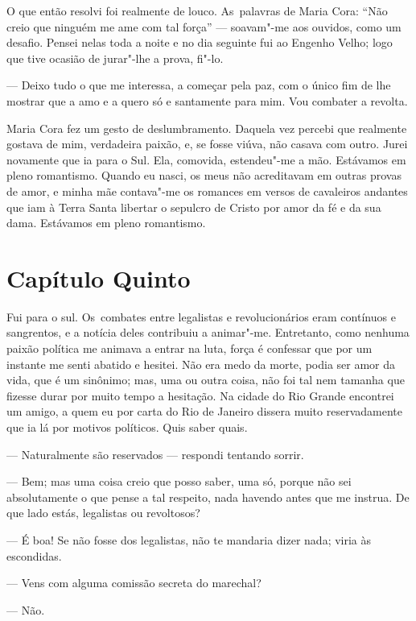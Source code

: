 \begin{linenumbers}
O que então resolvi foi realmente de louco. As~palavras de Maria Cora:
``Não creio que ninguém me ame com tal força'' --- soavam"-me aos ouvidos,
como um desafio. Pensei nelas toda a noite e no dia seguinte fui ao
Engenho Velho; logo que tive ocasião de jurar"-lhe a prova, fi"-lo.

--- Deixo tudo o que me interessa, a começar pela paz, com o único fim de
lhe mostrar que a amo e a quero só e santamente para mim. Vou combater a
revolta.

Maria Cora fez um gesto de deslumbramento. Daquela vez percebi que
realmente gostava de mim, verdadeira paixão, e, se fosse viúva, não
casava com outro. Jurei novamente que ia para o Sul. Ela, comovida,
estendeu"-me a mão. Estávamos em pleno romantismo. Quando eu nasci, os
meus não acreditavam em outras provas de amor, e minha mãe contava"-me os
romances em versos de cavaleiros andantes que iam à Terra Santa libertar
o sepulcro de Cristo por amor da fé e da sua dama. Estávamos em pleno
romantismo.

\section{Capítulo Quinto}

Fui para o sul. Os~combates entre legalistas e revolucionários eram
contínuos e sangrentos, e a notícia deles contribuiu a animar"-me.
Entretanto, como nenhuma paixão política me animava a entrar na luta,
força é confessar que por um instante me senti abatido e hesitei. Não
era medo da morte, podia ser amor da vida, que é um sinônimo; mas, uma
ou outra coisa, não foi tal nem tamanha que fizesse durar por muito
tempo a hesitação. Na cidade do Rio Grande encontrei um amigo, a quem eu
por carta do Rio de Janeiro dissera muito reservadamente que ia lá por
motivos políticos. Quis saber quais.

--- Naturalmente são reservados --- respondi tentando sorrir.

--- Bem; mas uma coisa creio que posso saber, uma só, porque não sei
absolutamente o que pense a tal respeito, nada havendo antes que me
instrua. De que lado estás, legalistas ou revoltosos?

--- É boa! Se não fosse dos legalistas, não te mandaria dizer nada; viria
às escondidas.

--- Vens com alguma comissão secreta do marechal?

--- Não.


\end{linenumbers}
